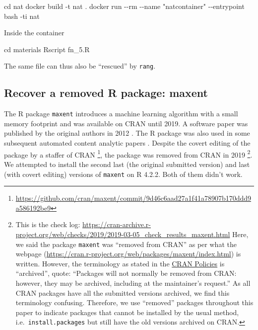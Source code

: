 \documentclass[
  10pt,
  letterpaper,
]{article}
\newenvironment{Shaded}{\begin{snugshade}}{\end{snugshade}}
\newcommand{\NormalTok}[1]{\textcolor[rgb]{0.00,0.23,0.31}{#1}}
\newcommand{\SpecialCharTok}[1]{\textcolor[rgb]{0.37,0.37,0.37}{#1}}
\newcommand{\StringTok}[1]{\textcolor[rgb]{0.13,0.47,0.30}{#1}}
\begin{document}
\begin{Shaded}
\begin{Highlighting}[]
\NormalTok{cd nat}
\NormalTok{docker build }\SpecialCharTok{{-}}\NormalTok{t nat .}
\NormalTok{docker run }\SpecialCharTok{{-}{-}}\NormalTok{rm }\SpecialCharTok{{-}{-}}\NormalTok{name }\StringTok{"natcontainer"} \SpecialCharTok{{-}{-}}\NormalTok{entrypoint bash }\SpecialCharTok{{-}}\NormalTok{ti nat}
\end{Highlighting}
\end{Shaded}

Inside the container

\begin{Shaded}
\begin{Highlighting}[]
\NormalTok{cd materials}
\NormalTok{Rscript fn\_5.R}
\end{Highlighting}
\end{Shaded}

The same file can thus also be ``rescued'' by \texttt{rang}.

\hypertarget{recover-a-removed-r-package-maxent}{%
\subsection{Recover a removed R package:
maxent}\label{recover-a-removed-r-package-maxent}}

The R package \texttt{maxent} introduces a machine learning algorithm
with a small memory footprint and was available on CRAN until 2019. A
software paper was published by the original authors in 2012
\citep{jurka:2012}. The R package was also used in some subsequent
automated content analytic papers \citep[e.g.][]{loercher:2017:D}.
Despite the covert editing of the package by a staffer of CRAN
\footnote{\url{https://github.com/cran/maxent/commit/9d46c6aad27a1f41a78907b170ddd9a586192be9}},
the package was removed from CRAN in 2019 \footnote{This is the check
  log:
  \url{https://cran-archive.r-project.org/web/checks/2019/2019-03-05_check_results_maxent.html}
  Here, we said the package \texttt{maxent} was ``removed from CRAN'' as
  per what the webpage
  (\url{https://cran.r-project.org/web/packages/maxent/index.html}) is
  written. However, the terminology as stated in the
  \href{https://cran.r-project.org/web/packages/policies.html\#Source-packages}{CRAN
  Policies} is ``archived'', quote: ``Packages will not normally be
  removed from CRAN: however, they may be archived, including at the
  maintainer's request.'' As all CRAN packages have all the submitted
  versions archived, we find this terminology confusing. Therefore, we
  use ``removed'' packages throughout this paper to indicate packages
  that cannot be installed by the usual method,
  i.e.~\texttt{install.packages} but still have the old versions
  archived on CRAN.}. We attempted to install the second last (the
original submitted version) and last (with covert editing) versions of
\texttt{maxent} on R 4.2.2. Both of them didn't work.
\end{document}

